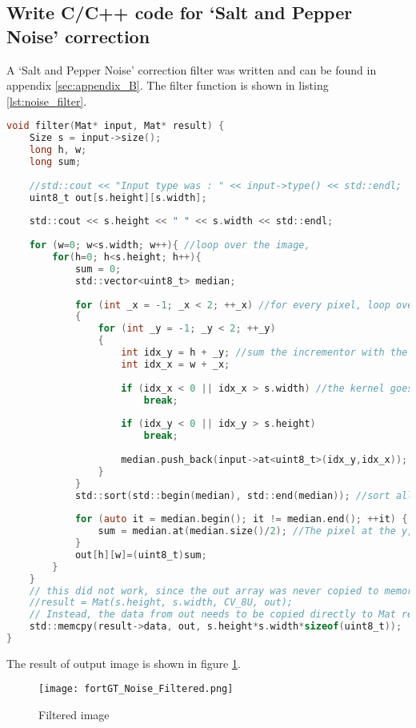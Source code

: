 \subsection{Write C/C++ code for ‘Salt and Pepper Noise’ correction}

A ‘Salt and Pepper Noise’ correction filter was written and can be found in appendix \ref{sec:appendix_B}. The filter function is shown in listing \ref{lst:noise_filter}.

\begin{lstlisting}[language=C, caption=Noise correction filter, label=lst:noise_filter]
void filter(Mat* input, Mat* result) {
    Size s = input->size();
    long h, w;
    long sum;
    
    //std::cout << "Input type was : " << input->type() << std::endl;
    uint8_t out[s.height][s.width];
    
    std::cout << s.height << " " << s.width << std::endl;
    
    for (w=0; w<s.width; w++){ //loop over the image, 
        for(h=0; h<s.height; h++){
            sum = 0;
            std::vector<uint8_t> median;
            
            for (int _x = -1; _x < 2; ++_x) //for every pixel, loop over every pixel in a 3x3 kernel
            {
                for (int _y = -1; _y < 2; ++_y)
                {
                    int idx_y = h + _y; //sum the incrementor with the kernel's, so we can identify borders
                    int idx_x = w + _x;
                    
                    if (idx_x < 0 || idx_x > s.width) //the kernel goes outside of the image, therefore break and ignore that pixel.
                        break;
                        
                    if (idx_y < 0 || idx_y > s.height)
                        break;
                    
                    median.push_back(input->at<uint8_t>(idx_y,idx_x)); // Add all the pixels from the kernel into a vector
                }
            }
            std::sort(std::begin(median), std::end(median)); //sort all pixel values from high to low
                    
            for (auto it = median.begin(); it != median.end(); ++it) {
                sum = median.at(median.size()/2); //The pixel at the y,x coordinate is now the median from our 3x3 sliding window
            }
            out[h][w]=(uint8_t)sum;
        }
    }
    // this did not work, since the out array was never copied to memory, causing image data pointing to nowhere!
    //result = Mat(s.height, s.width, CV_8U, out); 
    // Instead, the data from out needs to be copied directly to Mat result with the correct size
    std::memcpy(result->data, out, s.height*s.width*sizeof(uint8_t));
}
\end{lstlisting}


The result of output image is shown in figure \ref{fig:fortGT_Noise_Filtered}.

\begin{figure}[h!]
    \centering
    \texttt{[image: fortGT\_Noise\_Filtered.png]}
    \caption{Filtered image}
    \label{fig:fortGT_Noise_Filtered}
\end{figure}